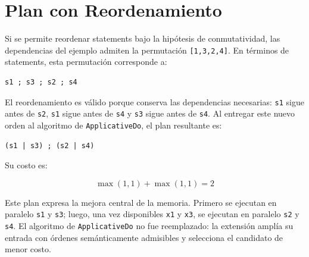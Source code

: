 
\section{Plan con Reordenamiento}

Si se permite reordenar statements bajo la hipótesis de conmutatividad, las dependencias del ejemplo admiten la permutación \verb|[1,3,2,4]|. En términos de statements, esta permutación corresponde a:

\begin{verbatim}
s1 ; s3 ; s2 ; s4
\end{verbatim}

El reordenamiento es válido porque conserva las dependencias necesarias: \texttt{s1} sigue antes de \texttt{s2}, \texttt{s1} sigue antes de \texttt{s4} y \texttt{s3} sigue antes de \texttt{s4}. Al entregar este nuevo orden al algoritmo de \texttt{ApplicativeDo}, el plan resultante es:

\begin{verbatim}
(s1 | s3) ; (s2 | s4)
\end{verbatim}

Su costo es:

\[
\max(1, 1) + \max(1, 1) = 2
\]

Este plan expresa la mejora central de la memoria. Primero se ejecutan en paralelo \texttt{s1} y \texttt{s3}; luego, una vez disponibles \texttt{x1} y \texttt{x3}, se ejecutan en paralelo \texttt{s2} y \texttt{s4}. El algoritmo de \texttt{ApplicativeDo} no fue reemplazado: la extensión amplía su entrada con órdenes semánticamente admisibles y selecciona el candidato de menor costo.
